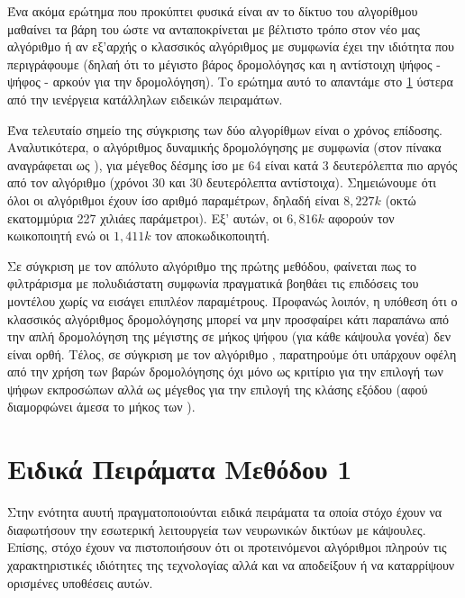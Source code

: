 Ένα ακόμα ερώτημα που προκύπτει φυσικά είναι αν το δίκτυο του αλγορίθμου  μαθαίνει τα βάρη του ώστε να ανταποκρίνεται με βέλτιστο τρόπο στον νέο μας αλγόριθμο ή αν εξ'αρχής ο κλασσικός αλγόριθμος με συμφωνία έχει την ιδιότητα που περιγράφουμε (δηλαή ότι το μέγιστο βάρος δρομολόγησς και η αντίστοιχη ψήφος - ψήφος  - αρκούν για την δρομολόγηση). Το ερώτημα αυτό το απαντάμε στο \ref{sec:method1_special_experiments} ύστερα από την ιενέργεια κατάλληλων ειδεικών πειραμάτων.\par

Ένα τελευταίο σημείο της σύγκρισης των δύο αλγορίθμων είναι ο χρόνος επίδοσης. Αναλυτικότερα, ο αλγόριθμος δυναμικής δρομολόγησης με συμφωνία (στον πίνακα αναγράφεται ως ), για μέγεθος δέσμης ίσο με 64 είναι κατά 3 δευτερόλεπτα πιο αργός από τον αλγόριθμο  (χρόνοι 30 και 30 δευτερόλεπτα αντίστοιχα). Σημειώνουμε ότι όλοι οι αλγόριθμοι έχουν ίσο αριθμό παραμέτρων, δηλαδή είναι $8,227k$ (οκτώ εκατομμύρια 227 χιλιάες παράμετροι). Εξ' αυτών, οι $6,816k$ αφορούν τον κωικοποιητή ενώ οι $1,411k$ τον αποκωδικοποιητή.\par  

Σε σύγκριση με τον απόλυτο αλγόριθμο  της πρώτης μεθόδου, φαίνεται πως το φιλτράρισμα με πολυδιάστατη συμφωνία πραγματικά βοηθάει τις επιδόσεις του μοντέλου χωρίς να εισάγει επιπλέον παραμέτρους. Προφανώς λοιπόν, η υπόθεση ότι ο κλασσικός αλγόριθμος δρομολόγησης μπορεί να μην προσφαίρει κάτι παραπάνω από την απλή δρομολόγηση της μέγιστης σε μήκος ψήφου (για κάθε κάψουλα γονέα) δεν είναι ορθή. Τέλος, σε σύγκριση με τον αλγόριθμο , παρατηρούμε ότι υπάρχουν οφέλη από την χρήση των βαρών δρομολόγησης όχι μόνο ως κριτίριο για την επιλογή των ψήφων εκπροσώπων αλλά ως μέγεθος για την επιλογή της κλάσης εξόδου (αφού διαμορφώνει άμεσα το μήκος των ).

\section{Ειδικά Πειράματα Μεθόδου 1}
\label{sec:method1_special_experiments}
Στην ενότητα αυυτή πραγματοποιούνται ειδικά πειράματα τα οποία στόχο έχουν να διαφωτήσουν την εσωτερική λειτουργεία των νευρωνικών δικτύων με κάψουλες. Επίσης, στόχο έχουν να πιστοποιήσουν ότι οι προτεινόμενοι αλγόριθμοι πληρούν τις χαρακτηριστικές ιδιότητες της τεχνολογίας αλλά και να αποδείξουν ή να καταρρίψουν ορισμένες υποθέσεις αυτών.

